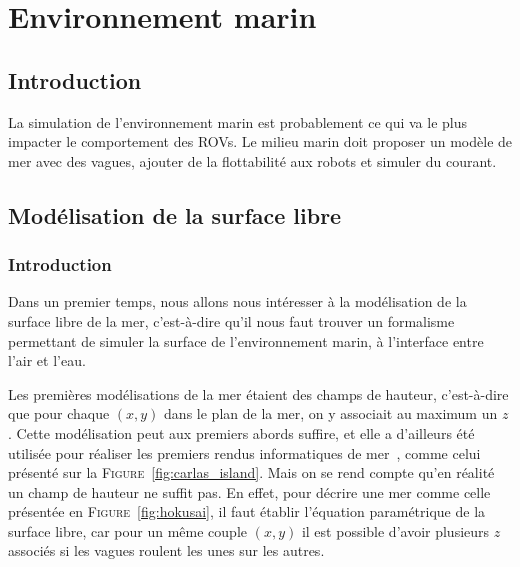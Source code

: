 	\section{Environnement marin}

		\subsection{Introduction}
			
			La simulation de l'environnement marin est probablement ce qui va le plus impacter le comportement des \gls{ROV}s. Le milieu marin doit proposer un modèle de mer avec des vagues, ajouter de la flottabilité aux robots et simuler du courant.

		\subsection{Modélisation de la surface libre}

			\subsubsection{Introduction}

				Dans un premier temps, nous allons nous intéresser à la modélisation de la surface libre de la mer, c’est-à-dire qu'il nous faut trouver un formalisme permettant de simuler la surface de l'environnement marin, à l'interface entre l'air et l'eau.

				Les premières modélisations de la mer étaient des champs de hauteur, c’est-à-dire que pour chaque $(x, y)$ dans le plan de la mer, on y associait au maximum un $z$. Cette modélisation peut aux premiers abords suffire, et elle a d'ailleurs été utilisée pour réaliser les premiers rendus informatiques de mer~\cite{scha80, max81}, comme celui présenté sur la \textsc{Figure}~\ref{fig:carlas_island}. Mais on se rend compte qu'en réalité un champ de hauteur ne suffit pas. En effet, pour décrire une mer comme celle présentée en \textsc{Figure}~\ref{fig:hokusai}, il faut établir l'équation paramétrique de la surface libre, car pour un même couple $(x, y)$ il est possible d'avoir plusieurs $z$ associés si les vagues roulent les unes sur les autres.

